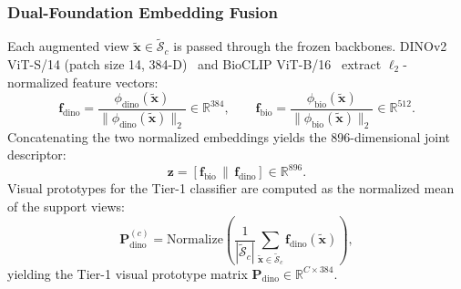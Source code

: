 \documentclass[preprint,12pt]{elsarticle}
\begin{document}
\subsubsection{Dual-Foundation Embedding Fusion}
Each augmented view $\tilde{\mathbf{x}} \in \tilde{\mathcal{S}}_c$ is passed through the frozen backbones. DINOv2 ViT-S/14 (patch size 14, 384-D)~\cite{oquab2023dinov2} and BioCLIP ViT-B/16~\cite{stevens2024bioclip} extract $\ell_2$-normalized feature vectors:
\begin{equation}
    \mathbf{f}_{\text{dino}} = \frac{\phi_{\text{dino}}(\tilde{\mathbf{x}})}{\|\phi_{\text{dino}}(\tilde{\mathbf{x}})\|_2} \in \mathbb{R}^{384}, \qquad
    \mathbf{f}_{\text{bio}} = \frac{\phi_{\text{bio}}(\tilde{\mathbf{x}})}{\|\phi_{\text{bio}}(\tilde{\mathbf{x}})\|_2} \in \mathbb{R}^{512}.
\end{equation}
Concatenating the two normalized embeddings yields the 896-dimensional joint descriptor:
\begin{equation}
    \mathbf{z} = [\mathbf{f}_{\text{bio}} \,\|\, \mathbf{f}_{\text{dino}}] \in \mathbb{R}^{896}.
\end{equation}
Visual prototypes for the Tier-1 classifier are computed as the normalized mean of the support views:
\begin{equation}
    \mathbf{P}_{\text{dino}}^{(c)} = \text{Normalize}\left(\frac{1}{|\tilde{\mathcal{S}}_c|}\sum_{\tilde{\mathbf{x}} \in \tilde{\mathcal{S}}_c} \mathbf{f}_{\text{dino}}(\tilde{\mathbf{x}})\right),
\end{equation}
yielding the Tier-1 visual prototype matrix $\mathbf{P}_{\text{dino}} \in \mathbb{R}^{C \times 384}$.
\end{document}
